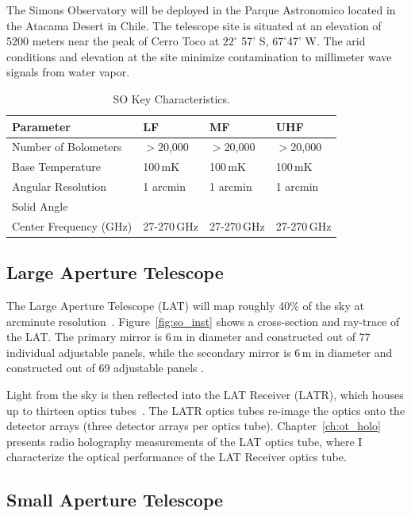 The Simons Observatory will be deployed in the Parque Astronomico located in the Atacama Desert in Chile. The telescope site is situated at an elevation of 5200 meters near the peak of Cerro Toco at $22 ^\circ$ 57' S, $67^\circ$47' W.  The arid conditions and elevation at the site minimize contamination to millimeter wave signals from water vapor. 

\begin{table}[b]
    \centering
    \begin{tabular}{|l|l|l|l|} \hline
        \textbf{ Parameter} &  \textbf{LF} &  \textbf{MF}  &  \textbf{UHF}  \\ \hline \hline
        Number of Bolometers & $>$20,000& $>$20,000& $>$20,000\\\hline
        Base Temperature & 100\,mK & 100\,mK & 100\,mK\\\hline
        Angular Resolution & 1 arcmin &1 arcmin &1 arcmin\\\hline
        Solid Angle & & &\\\hline
        Center Frequency (GHz) & 27-270\,GHz & 27-270\,GHz & 27-270\,GHz\\\hline
    \end{tabular} \caption{SO Key Characteristics.}
    \label{tab:so}
\end{table}

\subsection{Large Aperture Telescope}

The Large Aperture Telescope (LAT) will map roughly 40\% of the sky at arcminute resolution~\cite{xu/etal:2020c}.   Figure~\ref{fig:so_inst} shows a cross-section and ray-trace of the LAT.  The primary mirror is 6\,m in diameter and constructed out of 77 individual adjustable panels, while the secondary mirror is 6\,m in diameter and constructed out of 69 adjustable panels \cite{gali18}.

Light from the sky is then reflected into the LAT Receiver (LATR), which houses up to thirteen optics tubes~\cite{Xu_2021}.  The LATR optics tubes re-image the optics onto the detector arrays (three detector arrays per optics tube).  Chapter~\ref{ch:ot_holo} presents radio holography measurements of the LAT optics tube, where I characterize the optical performance of the LAT Receiver optics tube.

\subsection{Small Aperture Telescope}

